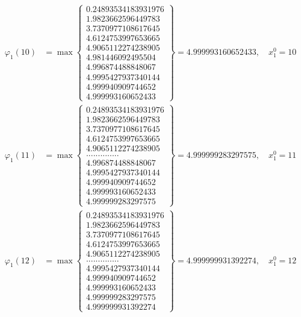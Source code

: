 \documentclass{article}
\begin{document}
\begin{align*}
  
  
  
\varphi_{1}(10) &= \max \left\{ \begin{array}{c}
0.24893534183931976 \\
 1.9823662596449783 \\
 3.7370977108617645 \\
 4.6124753997653665 \\
 4.9065112274238905 \\
 4.981446092495504 \\
 4.996874488848067 \\
 4.9995427937340144 \\
 4.999940909744652 \\
 4.999993160652433
\end{array} \right\} = 4.999993160652433, \quad x_{1}^0 = 10\\
  
  
  
  
\varphi_{1}(11) &= \max \left\{ \begin{array}{c}
0.24893534183931976 \\
 1.9823662596449783 \\
 3.7370977108617645 \\
 4.6124753997653665 \\
 4.9065112274238905 \\
 .............. \\
 4.996874488848067 \\
 4.9995427937340144 \\
 4.999940909744652 \\
 4.999993160652433 \\
 4.999999283297575
\end{array} \right\} = 4.999999283297575, \quad x_{1}^0 = 11\\
  
  
  
  
\varphi_{1}(12) &= \max \left\{ \begin{array}{c}
0.24893534183931976 \\
 1.9823662596449783 \\
 3.7370977108617645 \\
 4.6124753997653665 \\
 4.9065112274238905 \\
 .............. \\
 4.9995427937340144 \\
 4.999940909744652 \\
 4.999993160652433 \\
 4.999999283297575 \\
 4.999999931392274
\end{array} \right\} = 4.999999931392274, \quad x_{1}^0 = 12\\
  

\end{align*}
\end{document}
